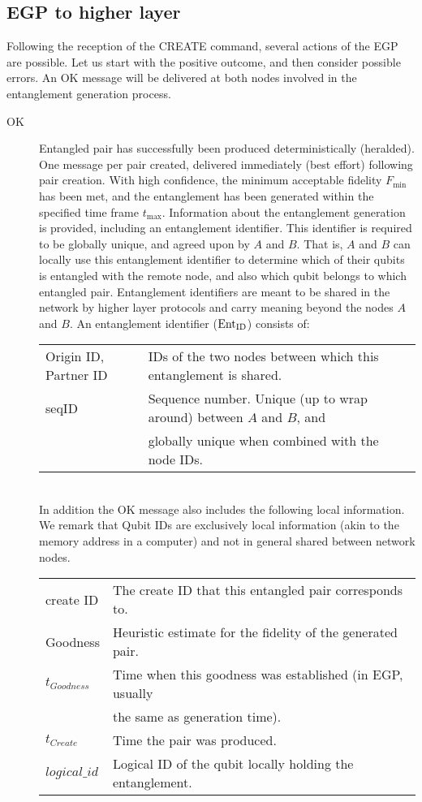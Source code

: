 \documentclass{article}
\newcommand{\entid}{{\rm Ent}_{\rm ID}}
\begin{document}
\subsection{EGP to higher layer}
Following the reception of the CREATE command, several actions of the EGP are possible. Let us start with the positive outcome, and then consider possible
errors. An OK message will be delivered at both nodes involved in the entanglement generation process.
\begin{description}
\item[OK] Entangled pair has successfully been produced deterministically (heralded). One message per pair created, delivered immediately (best effort) following pair creation.
With high confidence, the minimum acceptable fidelity $F_{\min}$ has been met, and the entanglement has been generated
within the specified time frame $t_{\max}$. Information about the entanglement generation is provided, including an entanglement identifier. This identifier is required
to be globally unique, and agreed upon by $A$ and $B$. That is, $A$ and $B$ can locally use this entanglement identifier to determine which of their qubits is entangled with the remote
node, and also which qubit belongs to which entangled pair. Entanglement identifiers are meant to be shared in the network by higher layer protocols and carry meaning beyond the nodes
$A$ and $B$. An entanglement identifier ($\entid$) consists of:\\
\noindent
\begin{tabular}{ll}
Origin ID, Partner ID & IDs of the two nodes between which this entanglement is shared.\\
seqID & Sequence number. Unique (up to wrap around) between $A$ and $B$, and \\
& globally unique when combined with the node IDs.\\
\end{tabular}\\

\smallskip
\noindent
In addition the OK message also includes the following local information. We remark that Qubit IDs are exclusively local information (akin to the memory address
in a computer) and not in general shared between network nodes.\\
\noindent
\begin{tabular}{ll}
create ID & The create ID that this entangled pair corresponds to. \\
Goodness & Heuristic estimate for the fidelity of the generated pair.\\
$t_{Goodness}$ & Time when this goodness was established (in EGP, usually \\
& the same as generation time).\\
$t_{Create}$ & Time the pair was produced.\\
$logical\_id$ & Logical ID of the qubit locally holding the entanglement.
\end{tabular}
\end{description}
\end{document}
